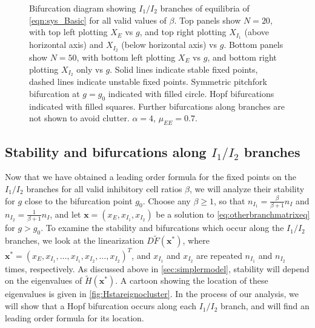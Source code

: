 \documentclass[reqno]{siamonline190516}
\newcommand{\xvec}{\mathbf{x}}
\begin{document}
\begin{figure}
\begin{tabular}{cc}
    \end{tabular}
    \caption{Bifurcation diagram showing $I_1/I_2$ branches of equilibria of \cref{eqn:sys_Basic} for all valid values of $\beta$. Top panels show $N=20$, with top left plotting $X_E$ vs $g$, and top right plotting $X_{I_1}$ (above horizontal axis) and $X_{I_2}$ (below horizontal axis) vs $g$. Bottom panels show $N=50$, with bottom left plotting $X_E$ vs $g$, and bottom right plotting $X_{I_2}$ only vs $g$. Solid lines indicate stable fixed points, dashed lines indicate unstable fixed points. Symmetric pitchfork bifurcation at $g = g_0$ indicated with filled circle. Hopf bifurcations indicated with filled squares. Further bifurcations along branches are not shown to avoid clutter. $\alpha = 4$, $\mu_{EE} = 0.7$.}
    \label{fig:noclusterBD1}
\end{figure}

\subsection{Stability and bifurcations along \texorpdfstring{$I_1/I_2$}{I1/I2} branches}

Now that we have obtained a leading order formula for the fixed points on the $I_1/I_2$ branches for all valid inhibitory cell ratios $\beta$, we will analyze their stability for $g$ close to the bifurcation point $g_0$. Choose any $\beta \geq 1$, so that $n_{I_1} = \frac{\beta}{\beta+1}n_I$ and $n_{I_2} = \frac{1}{\beta+1}n_I$, and let $\xvec = (x_E, x_{I_1}, x_{I_2})$ be a solution to \cref{eq:otherbranchmatrixeq} for $g > g_0$. To examine the stability and bifurcations which occur along the $I_1/I_2$ branches, we look at the linearization $D\tilde{F}(\xvec^*)$, where $\xvec^* = (x_E, x_{I_1}, \dots, x_{I_1}, x_{I_2}, \dots, x_{I_2})^T$, and $x_{I_1}$ and $x_{I_2}$ are repeated $n_{I_1}$ and $n_{I_2}$ times, respectively. As discussed above in \cref{sec:simplermodel}, stability will depend on the eigenvalues of $\tilde{H}(\xvec^*)$. A cartoon showing the location of these eigenvalues is given in \cref{fig:Hstareignocluster}. In the process of our analysis, we will show that a Hopf bifurcation occurs along each $I_1/I_2$ branch, and will find an leading order formula for its location.
\end{document}
